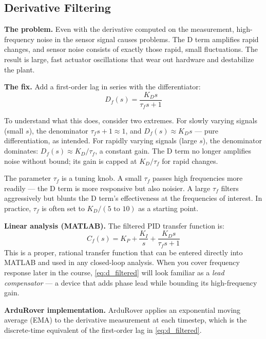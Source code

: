 \documentclass[12pt]{article}
\begin{document}
\subsection{Derivative Filtering}

\textbf{The problem.}
Even with the derivative computed on the measurement, high-frequency noise in
the sensor signal causes problems.  The D term amplifies rapid changes, and
sensor noise consists of exactly those rapid, small fluctuations.  The result
is large, fast actuator oscillations that wear out hardware and destabilize
the plant.

\textbf{The fix.}
Add a first-order lag in series with the differentiator:
\begin{equation}
  D_f(s) = \frac{K_D s}{\tau_f s + 1}
  \label{eq:d_filtered}
\end{equation}

To understand what this does, consider two extremes.  For slowly varying
signals (small $s$), the denominator $\tau_f s + 1 \approx 1$, and $D_f(s)
\approx K_D s$ --- pure differentiation, as intended.  For rapidly varying
signals (large $s$), the denominator dominates: $D_f(s) \approx K_D/\tau_f$,
a constant gain.  The D term no longer amplifies noise without bound; its gain
is capped at $K_D/\tau_f$ for rapid changes.

The parameter $\tau_f$ is a tuning knob.  A small $\tau_f$ passes high
frequencies more readily --- the D term is more responsive but also noisier.
A large $\tau_f$ filters aggressively but blunts the D term's effectiveness
at the frequencies of interest.  In practice, $\tau_f$ is often set to
$K_D/(5\text{ to }10)$ as a starting point.

\textbf{Linear analysis (MATLAB).}
The filtered PID transfer function is:
\begin{equation}
  C_f(s) = K_P + \frac{K_I}{s} + \frac{K_D s}{\tau_f s + 1}
  \label{eq:pid_filtered_tf}
\end{equation}
This is a proper, rational transfer function that can be entered directly
into MATLAB and used in any closed-loop analysis.  When you cover frequency
response later in the course, \cref{eq:d_filtered} will look familiar as a
\emph{lead compensator} --- a device that adds phase lead while bounding
its high-frequency gain.

\textbf{ArduRover implementation.}
ArduRover applies an exponential moving average (EMA) to the derivative
measurement at each timestep, which is the discrete-time equivalent of the
first-order lag in \cref{eq:d_filtered}.
\end{document}
